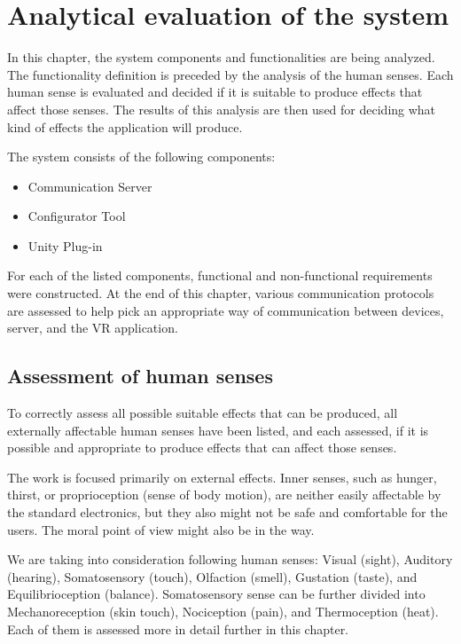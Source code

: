 \chapter{Analytical evaluation of the system}

In this chapter, the system components and functionalities are being analyzed.
The functionality definition is preceded by the analysis of the human senses.
Each human sense is evaluated and decided if it is suitable to produce effects
that affect those senses. The results of this analysis are then used for
deciding what kind of effects the application will produce.


The system consists of the following components:


\begin{itemize}

\item Communication Server

\item Configurator Tool

\item Unity Plug-in

\end{itemize}


For each of the listed components, functional and non-functional requirements
were constructed. At the end of this chapter, various communication protocols
are assessed to help pick an appropriate way of communication between devices,
server, and the VR application.


\hypertarget{x-assessment-of-human-senses}{\section{Assessment of human senses}}
To correctly assess all possible suitable effects that can be produced, all 
externally affectable human senses have been listed, and each assessed,
if it is possible and appropriate to produce effects that can affect those senses.


The work is focused primarily on external effects. Inner senses, such as
hunger, thirst, or proprioception (sense of body motion), are neither
easily affectable by the standard electronics, but they also might not be safe
and comfortable for the users. The moral point of view
might also be in the way.


We are taking into consideration following human senses:
Visual (sight), Auditory (hearing), Somatosensory (touch), Olfaction (smell),
Gustation (taste), and Equilibrioception (balance). Somatosensory sense can
be further divided into Mechanoreception (skin touch), Nociception (pain), and
Thermoception (heat). Each of them is assessed more in detail further in this
chapter.


